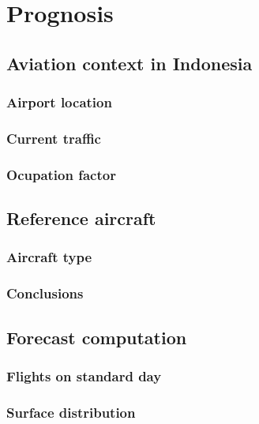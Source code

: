 \chapter{Prognosis}

	\section{Aviation context in Indonesia}
		\subsection{Airport location}
		\subsection{Current traffic}
		\subsection{Ocupation factor}
	
	\section{Reference aircraft}
		\subsection{Aircraft type}
		\subsection{Conclusions}
		
	\section{Forecast computation}
		\subsection{Flights on standard day}
		\subsection{Surface distribution}